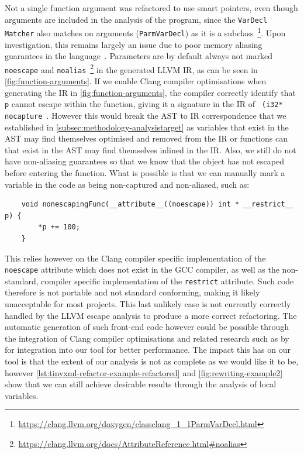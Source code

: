 \documentclass{mpaper}
\begin{document}
    Not a single function argument was refactored to use smart pointers, even though arguments are included in the analysis of the program, since the \texttt{VarDecl Matcher} also matches on arguments (\texttt{ParmVarDecl}) as it is a subclass~\footnote{\url{https://clang.llvm.org/doxygen/classclang_1_1ParmVarDecl.html}}.
    Upon investigation, this remains largely an issue due to poor memory aliasing guarantees in the language~\cite{C++17}. 
    Parameters are by default always not marked \texttt{noescape} and \texttt{noalias}~\footnote{\url{https://clang.llvm.org/docs/AttributeReference.html\#noalias}} in the generated LLVM IR, as can be seen in \autoref{fig:function-arguments}.
    If we enable Clang compiler optimisations when generating the IR in \autoref{fig:function-arguments}, the compiler correctly identify that \texttt{p} cannot escape within the function, giving it a signature in the IR of 
    \texttt{
    (i32* nocapture %
    }.
    However this would break the AST to IR correspondence that we established in \autoref{subsec:methodology-analysistarget} as variables that exist in the AST may find themselves optimised and removed from the IR or functions can that exist in the AST may find themselves inlined in the IR. 
    Also, we still do not have non-aliasing guarantees so that we know that the object has not escaped before entering the function.
    What is possible is that we can manually mark a variable in the code as being non-captured and non-aliased, such as:
    \begin{verbatim}
    void nonescapingFunc(__attribute__((noescape)) int * __restrict__ p) {
        *p += 100;
    }
    \end{verbatim}
    This relies however on the Clang compiler specific implementation of the \texttt{noescape} attribute which does not exist in the GCC compiler, as well as the non-standard, compiler specific implementation of the \texttt{restrict} attribute. 
    Such code therefore is not portable and not standard conforming, making it likely unacceptable for most projects.
    This last unlikely case is not currently correctly handled by the LLVM escape analysis to produce a more correct refactoring. 
    The automatic generation of such front-end code however could be possible through the integration of Clang compiler optimisations and related research such as by \citet{Campos2015} for integration into our tool for better performance.
    The impact this has on our tool is that the extent of our analysis is not as complete as we would like it to be, however \autoref{lst:tinyxml-refactor-example-refactored} and \autoref{fig:rewriting-example2} show that we can still achieve desirable results through the analysis of local variables. 
    
\end{document}
